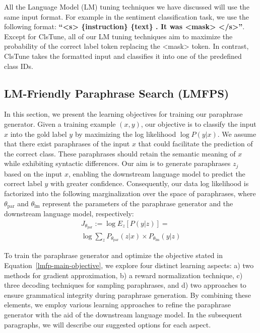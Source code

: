 \documentclass[11pt]{article}
\begin{document}
All the Language Model (LM) tuning techniques we have discussed will use the same input format. For example in the sentiment classification task, we use the following format:
\textbf{``<s> \{instruction\} \{text\} . It was <mask> </s>''}. Except for ClsTune, all of our LM tuning techniques aim to maximize the probability of the correct label token replacing the <mask> token. In contrast, ClsTune takes the formatted input and classifies it into one of the predefined class IDs.

\subsection{LM-Friendly Paraphrase Search (LMFPS)}
\label{paraphrase-objectives}
In this section, we present the learning objectives for training our paraphrase generator. Given a training example $(x, y)$, our objective is to classify the input $x$ into the gold label $y$ by maximizing the log likelihood $\log P(y|x)$. We assume that there exist paraphrases of the input $x$ that could facilitate the prediction of the correct class. These paraphrases should retain the semantic meaning of $x$ while exhibiting syntactic differences. Our aim is to generate paraphrases $z_{j}$ based on the input $x$, enabling the downstream language model to predict the correct label $y$ with greater confidence. Consequently, our data log likelihood is factorized into the following marginalization over the space of paraphrases, where $\theta_{\text{par}}$ and $\theta_{\text{lm}}$ represent the parameters of the paraphrase generator and the downstream language model, respectively:
\begin{multline}
J_{\theta_{\text{par}}} := \log E_{z} [P(y | z)] = \\ \log \sum_{z} P_{\theta_{\text{par}}}(z | x) \times P_{\theta_{\text{lm}}}(y | z)
\label{lmfp-main-objective}
\end{multline}

To train the paraphrase generator and optimize the objective stated in Equation~\ref{lmfp-main-objective}, we explore four distinct learning aspects: a) two methods for gradient approximation, b) a reward normalization technique, c) three decoding techniques for sampling paraphrases, and d) two approaches to ensure grammatical integrity during paraphrase generation. By combining these elements, we employ various learning approaches to refine the paraphrase generator with the aid of the downstream language model. In the subsequent paragraphs, we will describe our suggested options for each aspect.
\end{document}
